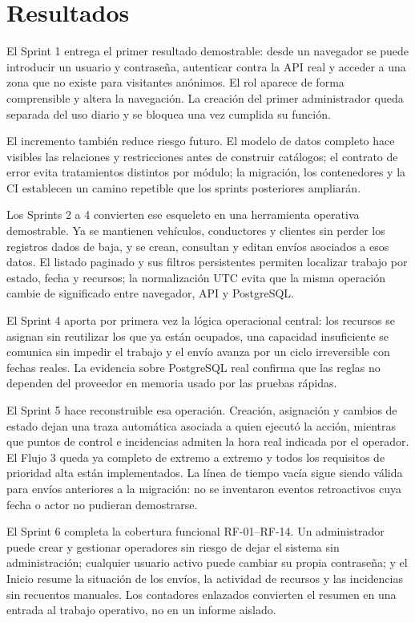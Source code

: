 \chapter{Resultados}

El Sprint 1 entrega el primer resultado demostrable: desde un navegador se puede introducir un usuario y contraseña, autenticar contra la API real y acceder a una zona que no existe para visitantes anónimos. El rol aparece de forma comprensible y altera la navegación. La creación del primer administrador queda separada del uso diario y se bloquea una vez cumplida su función.

El incremento también reduce riesgo futuro. El modelo de datos completo hace visibles las relaciones y restricciones antes de construir catálogos; el contrato de error evita tratamientos distintos por módulo; la migración, los contenedores y la CI establecen un camino repetible que los sprints posteriores ampliarán.

Los Sprints 2 a 4 convierten ese esqueleto en una herramienta operativa demostrable. Ya se mantienen vehículos, conductores y clientes sin perder los registros dados de baja, y se crean, consultan y editan envíos asociados a esos datos. El listado paginado y sus filtros persistentes permiten localizar trabajo por estado, fecha y recursos; la normalización UTC evita que la misma operación cambie de significado entre navegador, API y PostgreSQL.

El Sprint 4 aporta por primera vez la lógica operacional central: los recursos se asignan sin reutilizar los que ya están ocupados, una capacidad insuficiente se comunica sin impedir el trabajo y el envío avanza por un ciclo irreversible con fechas reales. La evidencia sobre PostgreSQL real confirma que las reglas no dependen del proveedor en memoria usado por las pruebas rápidas.

El Sprint 5 hace reconstruible esa operación. Creación, asignación y cambios de estado dejan una traza automática asociada a quien ejecutó la acción, mientras que puntos de control e incidencias admiten la hora real indicada por el operador. El Flujo 3 queda ya completo de extremo a extremo y todos los requisitos de prioridad alta están implementados. La línea de tiempo vacía sigue siendo válida para envíos anteriores a la migración: no se inventaron eventos retroactivos cuya fecha o actor no pudieran demostrarse.

El Sprint 6 completa la cobertura funcional RF-01--RF-14. Un administrador puede crear y gestionar operadores sin riesgo de dejar el sistema sin administración; cualquier usuario activo puede cambiar su propia contraseña; y el Inicio resume la situación de los envíos, la actividad de recursos y las incidencias sin recuentos manuales. Los contadores enlazados convierten el resumen en una entrada al trabajo operativo, no en un informe aislado.

